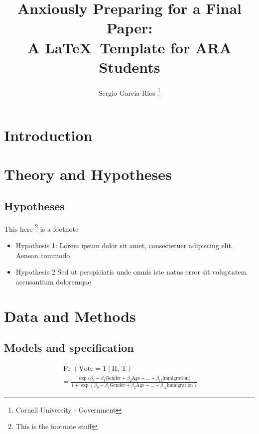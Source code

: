 \documentclass{article}
\author{Sergio Garcia-Rios 
	\thanks{Cornell University - Government}
	}
\title{Anxiously Preparing for a Final Paper: \\ 
A \LaTeX\  Template for ARA Students}
\date{}
\begin{document}
\maketitle
\clearpage

\section{Introduction}
\lipsum[1-3]

\section{Theory and Hypotheses}
\lipsum[2]

\subsection{Hypotheses}
\lipsum[2] This here \footnote{This is the footnote stuff} is a footnote

\begin{itemize}
    \item Hypothesis 1: Lorem ipsum dolor sit amet, consectetuer adipiscing elit. Aenean commodo
    \item Hypothesis 2 Sed ut perspiciatis unde omnis iste natus error sit voluptatem accusantium doloremque
\end{itemize}


\lipsum[1]

\section{Data and Methods}

\lipsum[2]


\lipsum[3]

\subsection{Models and specification}

\lipsum[4]


\begin{multline}
  \operatorname{Pr}(\text{Vote} = 1 \mid \text{H, T})\\
 = \frac{\exp(\beta_{0} + \beta_{1} \text{Gender} + \beta_{2} \text{Age} + \dots +
    \beta_{12} \text{immigration)} }{1 + \exp(\beta_{0} + \beta_{1} \text{Gender} + \beta_{2} \text{Age} +
\dots + \beta_{12 }\text{immigration})} \label{eq:glm1} 
\end{multline}
\end{document}
